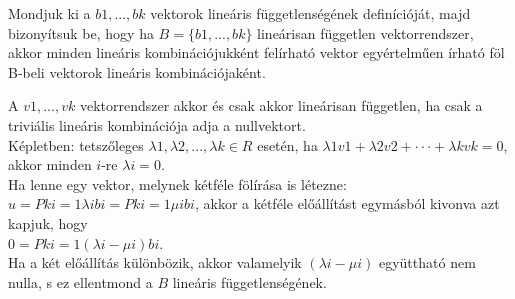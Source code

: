 \begin{frame}
  \begin{tcolorbox}[title={1. (4p)}]
    Mondjuk ki a $b1,...,bk$ vektorok lineáris függetlenségének definícióját, majd bizonyítsuk be, hogy ha $B = \{b1,...,bk\}$ lineárisan független vektorrendszer, akkor minden lineáris kombinációjukként felírható vektor egyértelműen írható föl B-beli vektorok lineáris kombinációjaként.
  \tcblower
  
    A $v1,...,vk$ vektorrendszer akkor és csak akkor lineárisan független, ha csak a triviális lineáris kombinációja adja a nullvektort.\\

    Képletben: tetszőleges ${\lambda}1,{\lambda}2,...,{\lambda}k \in R$ esetén, ha ${\lambda}1v1 + {\lambda}2v2 + ··· + {\lambda}kvk = 0$, akkor minden $i$-re ${\lambda}i = 0$.\\

    Ha lenne egy vektor, melynek kétféle fölírása is létezne: $u = Pk i=1 {\lambda}ibi = Pk i=1 {\mu}ibi$, akkor a kétféle előállítást egymásból kivonva azt kapjuk, hogy\\

    $0 = Pk i=1({\lambda}i -{\mu}i)bi$.\\

    Ha a két előállítás különbözik, akkor valamelyik $({\lambda}i-{\mu}i)$ együttható nem nulla, s ez ellentmond a $B$ lineáris függetlenségének.
  \end{tcolorbox}
\end{frame}


